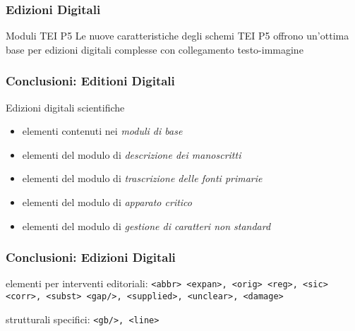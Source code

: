\begin{frame}
    \frametitle{Edizioni Digitali}
    \addtocounter{nframe}{1}
    

    \begin{block}{Moduli TEI P5}
        Le nuove caratteristiche degli schemi TEI P5 offrono un’ottima base per edizioni digitali complesse con collegamento testo-immagine
    \end{block}
    
\end{frame}



\begin{frame}
    \frametitle{Conclusioni: Editioni Digitali}
    \addtocounter{nframe}{1}
    

    \begin{block}{Edizioni digitali scientifiche}
        \begin{itemize}
            \item elementi contenuti nei \textit{moduli di base}
            \item elementi del modulo di \textit{descrizione dei manoscritti}
            \item elementi del modulo di \textit{trascrizione delle fonti primarie}
            \item elementi del modulo di \textit{apparato critico}
            \item elementi del modulo di \textit{gestione di caratteri non standard}
        \end{itemize}
    \end{block}
    
\end{frame}


\begin{frame}
    \frametitle{Conclusioni: Edizioni Digitali}
    \addtocounter{nframe}{1}
    

    \begin{block}{elementi per interventi editoriali:}
        \texttt{<abbr> <expan>, <orig> <reg>, <sic> <corr>, <subst>
        <gap/>, <supplied>, <unclear>, <damage>}
    \end{block}

    \begin{block}{strutturali specifici:}
        \texttt{<gb/>, <line>}
    \end{block}
    
\end{frame}


